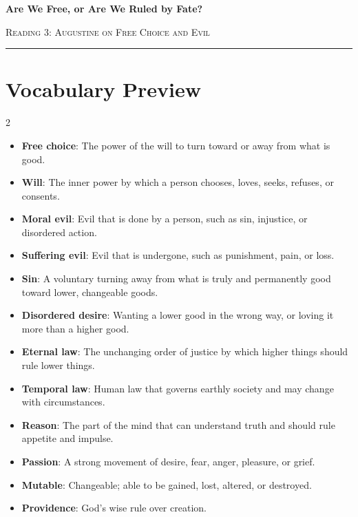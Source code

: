 \documentclass[12pt]{article}
\begin{document}
\begin{center}
{\LARGE\bfseries Are We Free, or Are We Ruled by Fate?}\par\vspace{0.25em}
{\large\scshape Reading 3: Augustine on Free Choice and Evil}\par\vspace{0.45em}
\rule{0.82\textwidth}{0.4pt}\par\vspace{0.7em}
\end{center}

\section*{Vocabulary Preview}
\begin{multicols}{2}
\begin{itemize}[leftmargin=*, itemsep=0.18em]
\item \textbf{Free choice}: The power of the will to turn toward or away from what is good.
\item \textbf{Will}: The inner power by which a person chooses, loves, seeks, refuses, or consents.
\item \textbf{Moral evil}: Evil that is done by a person, such as sin, injustice, or disordered action.
\item \textbf{Suffering evil}: Evil that is undergone, such as punishment, pain, or loss.
\item \textbf{Sin}: A voluntary turning away from what is truly and permanently good toward lower, changeable goods.
\item \textbf{Disordered desire}: Wanting a lower good in the wrong way, or loving it more than a higher good.
\item \textbf{Eternal law}: The unchanging order of justice by which higher things should rule lower things.
\item \textbf{Temporal law}: Human law that governs earthly society and may change with circumstances.
\item \textbf{Reason}: The part of the mind that can understand truth and should rule appetite and impulse.
\item \textbf{Passion}: A strong movement of desire, fear, anger, pleasure, or grief.
\item \textbf{Mutable}: Changeable; able to be gained, lost, altered, or destroyed.
\item \textbf{Providence}: God's wise rule over creation.
\end{itemize}
\end{multicols}
\end{document}
